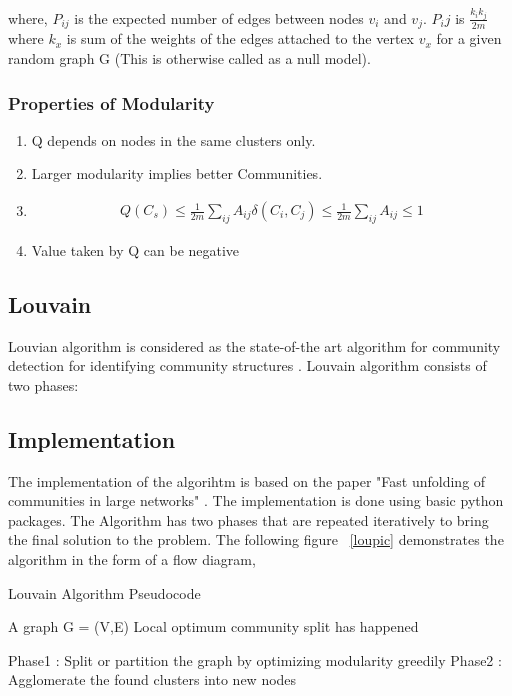 where, $P_{ij}$ is the expected number of edges between nodes $v_i$ and $v_j$. $P_ij$ is $\frac{k_ik_j}{2m}$ where $k_x$ is sum of the weights of the edges attached to the vertex $v_x$ for a given random graph G (This is otherwise called as a null model).
    
\subsubsection{Properties of Modularity}
\begin{enumerate}
 \item Q depends on nodes in the same clusters only. 
  \item Larger modularity implies better Communities.
    \item 
    \begin{equation}
    \begin{split}
Q(C_s) \leq \frac{1}{2m} \sum_{ij} A_{ij} \delta(C_i,C_j) \leq \frac{1}{2m} \sum_{ij} A_{ij} \leq 1
\end{split}
    \end{equation}
 \item Value taken by Q can be negative
 \end{enumerate}
 
 \subsection{Louvain}
 Louvian algorithm is considered as the state-of-the art algorithm for community detection for identifying community structures \cite{louvain}. Louvain algorithm consists of two phases:


\subsection{Implementation}

The implementation  of the algorihtm is based on the paper "Fast unfolding of communities in large networks" \cite{louvain}.  The implementation is done using basic python packages. 
 The Algorithm has two phases that are repeated iteratively to bring the final solution to the problem. The following figure ~\ref{loupic} demonstrates the algorithm in the form of a flow diagram,
 
\begin{algorithm}[H]
\caption{Louvain Algorithm Pseudocode}
\begin{algorithmic} 
\REQUIRE A graph G = (V,E)
\ENSURE Local optimum community split has happened

\STATE Phase1 : Split or partition the graph by optimizing modularity greedily
\STATE Phase2 : Agglomerate the found clusters into new nodes
\ENDWHILE
\end{algorithmic}
\end{algorithm}


